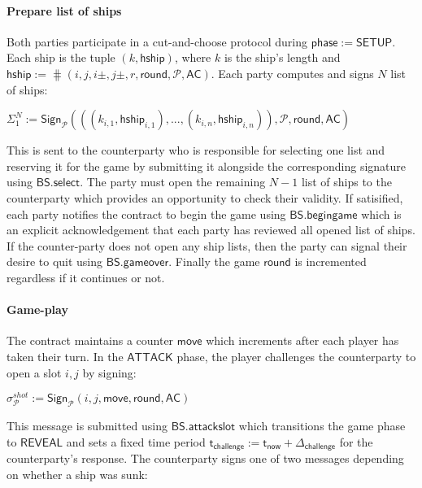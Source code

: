 \documentclass{llncs}
\newcommand{\gamestatus}{\mathsf{phase}}
\newcommand{\gamesetup}{\mathsf{SETUP}}
\newcommand{\gameattack}{\mathsf{ATTACK}}
\newcommand{\gamereveal}{\mathsf{REVEAL}}
\newcommand{\hship}{\mathsf{hship}}
\newcommand{\participant}{\mathcal{P}}
\newcommand{\sign}{\mathsf{Sign}}
\newcommand{\battleshipattackslot}{\mathsf{BS.attackslot}}
\newcommand{\battleshipbegin}{\mathsf{BS.begingame}}
\newcommand{\battleshipselectboard}{\mathsf{BS.select}}
\newcommand{\battleshipgameover}{\mathsf{BS.gameover}}
\newcommand{\appcontract}{\mathsf{AC}}
\newcommand{\timerchallenge}{\mathsf{\Delta}_{\mathsf{challenge}}}
\newcommand{\timechallenge}{\mathsf{t}_{\mathsf{challenge}}}
\newcommand{\timenow}{\mathsf{t}_{\mathsf{now}}}
\begin{document}
\paragraph{Prepare list of ships} Both parties participate in a cut-and-choose protocol during $\gamestatus := \gamesetup$. 
Each ship is the tuple $(k,\hship)$, where $k$ is the ship's length and $\hship := \hash(i,j,i\pm,j\pm,r, \mathsf{round}, \participant, \appcontract)$.
Each party computes and signs $N$ list of ships: 

\begin{center}
 $\Sigma_{1}^{N} := \sign_{\participant}(((k_{i,1},\hship_{i,1}),...,(k_{i,n},\hship_{i,n})), \participant, \mathsf{round}, \appcontract)$ 
\end{center}
 
This is sent to the counterparty who is responsible for selecting one list and reserving it for the game by submitting it alongside the corresponding signature using $\battleshipselectboard$. 
The party must open the remaining $N-1$ list of ships to the counterparty which provides an opportunity to check their validity. 
If satisified, each party notifies the contract to begin the game using $\battleshipbegin$ which is an explicit acknowledgement that each party has reviewed all opened list of ships.
If the counter-party does not open any ship lists, then the party can signal their desire to quit  using $\battleshipgameover$.
Finally the game $\mathsf{round}$ is incremented regardless if it continues or not. 

\paragraph{Game-play} \label{sec:gameplayships}
The contract maintains a counter $\mathsf{move}$ which increments after each player has taken their turn. 
In the $\gameattack$ phase, the player challenges the counterparty to open a slot $i,j$ by signing: 

\begin{center}
	$\sigma^{shot}_{\participant} := \sign_{\participant}(i,j, \mathsf{move}, \mathsf{round},\appcontract)$ \\
\end{center}

This message is submitted using $\battleshipattackslot$ which transitions the game phase to $\gamereveal$ and sets a fixed time period $\timechallenge := \timenow + \timerchallenge$ for the counterparty's response. 
The counterparty signs one of two messages depending on whether a ship was sunk:
\end{document}
